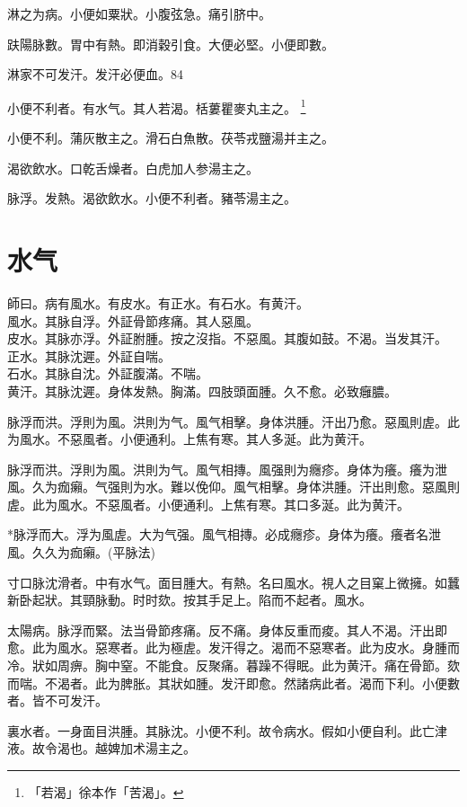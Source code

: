 淋之为病。小便如粟狀。小腹弦急。痛引脐中。

趺陽脉數。胃中有熱。即消穀引食。大便必堅。小便即數。

淋家不可发汗。发汗必便血。84

小便不利者。有水气。其人若渴。栝蔞瞿麥丸主之。
	\footnote{「若渴」徐本作「苦渴」。}

小便不利。蒲灰散主之。滑石白魚散。茯苓戎鹽湯并主之。

渴欲飲水。口乾舌燥者。白虎加人参湯主之。

脉浮。发熱。渴欲飲水。小便不利者。豬苓湯主之。

\chapter{水气}

師曰。病有風水。有皮水。有正水。有石水。有黄汗。\\
風水。其脉自浮。外証骨節疼痛。{\khaaitp 其人}惡風。\\
皮水。其脉亦浮。外証胕腫。按之沒指。不惡風。其腹如鼓。不渴。当发其汗。\\
正水。其脉沈遲。外証自喘。\\
石水。其脉自沈。外証腹滿。不喘。\\
黄汗。其脉沈遲。身{\khaaitp 体}发熱。胸滿。四肢頭面腫。久不愈。必致癰膿。

脉浮而洪。浮則为風。洪則为气。風气相擊。身体洪腫。汗出乃愈。惡風則虗。此为風水。不惡風者。小便通利。上焦有寒。其人多涎。此为黄汗。{\wuben}

脉浮而洪。浮則为風。洪則为气。風气相摶。風强則为癮疹。身体为癢。癢为泄風。久为痂癩。气强則为水。難以俛仰。風气相擊。身体洪腫。汗出則愈。惡風則虗。此为風水。不惡風者。小便通利。上焦有寒。其口多涎。此为黄汗。{\dengben}

*脉浮而大。浮为風虗。大为气强。風气相摶。必成癮疹。身体为癢。癢者名泄風。久久为痂癩。(平脉法)

寸口脉沈滑者。中有水气。面目腫大。有熱。名曰風水。視人之目窠上微擁。如{\khaaitp 蠶}新卧起狀。其頸脉動。时时欬。按其手足上。陷而不起者。風水。

太陽病。脉浮而緊。法当骨節疼痛。反不痛。身体反重而痠。其人不渴。汗出即愈。此为風水。惡寒者。此为極虗。发汗得之。渴而不惡寒者。此为皮水。身腫而冷。狀如周痹。胸中窒。不能食。反聚痛。暮躁不得眠。此为黄汗。痛在骨節。欬而喘。不渴者。此为脾胀。其狀如腫。发汗即愈。然諸病此者。渴而下利。小便數者。皆不可发汗。

裏水者。一身面目洪腫。其脉沈。小便不利。故令病水。假如小便自利。此亡津液。故令渴也。越婢加术湯主之。

